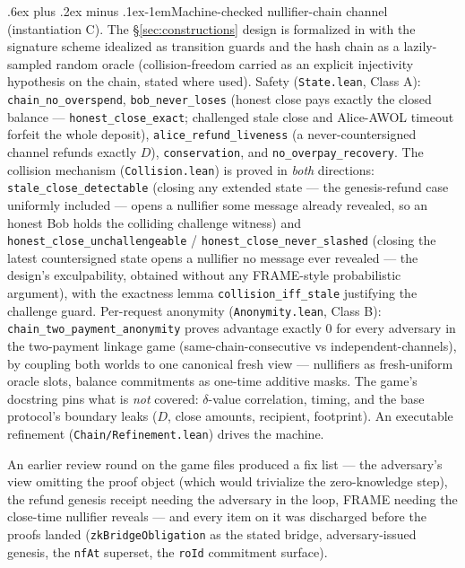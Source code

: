 \documentclass[9pt]{extarticle}
\makeatletter
\renewcommand\paragraph{\@startsection{paragraph}{4}{0pt}%
  {.6ex plus .2ex minus .1ex}{-1em}{\normalfont\normalsize\bfseries}}
\newcommand{\decl}[1]{\nolinkurl{#1}}
\newcommand{\file}[1]{\path{#1}}
\makeatother
\begin{document}
\paragraph{Machine-checked nullifier-chain channel (instantiation C).}
The \S\ref{sec:constructions} design is formalized in
\file{Zkpc/Chain/} with the signature scheme idealized as transition
guards and the hash chain as a lazily-sampled random oracle
(collision-freedom carried as an explicit injectivity hypothesis on the
chain, stated where used). Safety (\texttt{State.lean}, Class A):
\decl{chain_no_overspend}, \decl{bob_never_loses} (honest close
pays exactly the closed balance --- \decl{honest_close_exact};
challenged stale close and Alice-AWOL timeout forfeit the whole deposit),
\decl{alice_refund_liveness} (a never-countersigned channel refunds
exactly $D$), \decl{conservation}, and \decl{no_overpay_recovery}.
The collision mechanism (\texttt{Collision.lean}) is proved in
\emph{both} directions: \decl{stale_close_detectable} (closing any
extended state --- the genesis-refund case uniformly included --- opens a
nullifier some message already revealed, so an honest Bob holds the
colliding challenge witness) and \decl{honest_close_unchallengeable}
/ \decl{honest_close_never_slashed} (closing the latest
countersigned state opens a nullifier no message ever revealed --- the
design's exculpability, obtained without any FRAME-style probabilistic
argument), with the exactness lemma \decl{collision_iff_stale}
justifying the challenge guard. Per-request anonymity
(\texttt{Anonymity.lean}, Class B):
\decl{chain_two_payment_anonymity} proves advantage exactly $0$
for every adversary in the two-payment linkage game
(same-chain-consecutive vs independent-channels), by coupling both worlds
to one canonical fresh view --- nullifiers as fresh-uniform oracle slots,
balance commitments as one-time additive masks. The game's docstring pins
what is \emph{not} covered: $\delta$-value correlation, timing, and the
base protocol's boundary leaks ($D$, close amounts, recipient,
footprint). An executable refinement (\texttt{Chain/Refinement.lean})
drives the machine.

An earlier review round on the game files produced a fix list --- the
adversary's view omitting the proof object (which would trivialize the
zero-knowledge step), the refund genesis receipt needing the adversary in
the loop, FRAME needing the close-time nullifier reveals --- and every item
on it was discharged before the proofs landed (\decl{zkBridgeObligation}
as the stated bridge, adversary-issued genesis, the \decl{nfAt} superset,
the \decl{roId} commitment surface).
\end{document}
